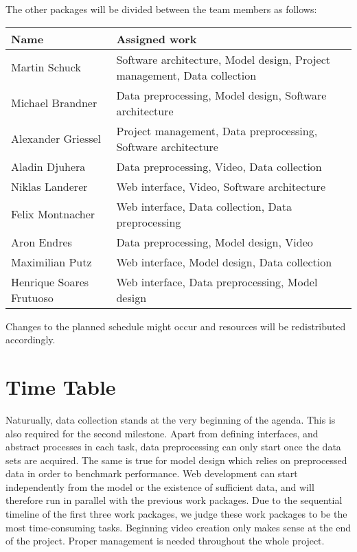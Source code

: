 \documentclass[s=english,inputenc=utf8,fontsize=10pt]{ldvarticle}
\begin{document}
The other packages will be divided between the team members as follows:
\begin{center}
	\begin{footnotesize}
		\setlength{\arrayrulewidth}{1,05pt}
		\begin{tabular}[htb]{|p{3cm}|p{9.1cm}|}
			\hline
			\textbf{Name} & \textbf{Assigned work} \\
			\hline
			\hline
			\rowcolor{lightgray} Martin Schuck & Software architecture, Model design, Project management, Data collection \\
			\hline
			\rowcolor{lightgray} Michael Brandner & Data preprocessing, Model design, Software architecture \\
			\hline	
			\rowcolor{lightgray} Alexander Griessel & Project management, Data preprocessing, Software architecture \\
			\hline
			\rowcolor{lightgray} Aladin Djuhera & Data preprocessing, Video, Data collection \\
			\hline
			\rowcolor{lightgray} Niklas Landerer & Web interface, Video, Software architecture \\
			\hline
			\rowcolor{lightgray} Felix Montnacher & Web interface, Data collection, Data preprocessing\\
			\hline	
			\rowcolor{lightgray} Aron Endres & Data preprocessing, Model design, Video \\
			\hline
			\rowcolor{lightgray} Maximilian Putz & Web interface, Model design, Data collection \\
			\hline
			\rowcolor{lightgray} Henrique Soares Frutuoso & Web interface, Data preprocessing, Model design \\
			\hline
		\end{tabular}
	\end{footnotesize}
\end{center}
Changes to the planned schedule might occur and resources will be redistributed accordingly.
\newpage

\section{Time Table}

Naturually, data collection stands at the very beginning of the agenda. This is also required for the second milestone. Apart from defining interfaces, and abstract processes in each task, data preprocessing can only start once the data sets are acquired. The same is true for model design which relies on preprocessed data in order to benchmark performance. Web development can start independently from the model or the existence of sufficient data, and will therefore run in parallel with the previous work packages. Due to the sequential timeline of the first three work packages, we judge these work packages to be the most time-consuming tasks. Beginning video creation only makes sense at the end of the project. Proper management is needed throughout the whole project.
\end{document}
